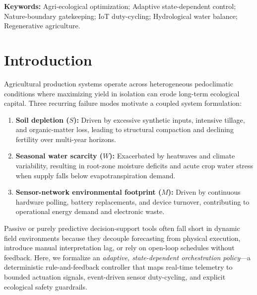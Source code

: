 \documentclass[11pt,a4paper]{article}
\begin{document}
\noindent\textbf{Keywords:} Agri-ecological optimization; Adaptive state-dependent control; Nature-boundary gatekeeping; IoT duty-cycling; Hydrological water balance; Regenerative agriculture.

\section{Introduction}
Agricultural production systems operate across heterogeneous pedoclimatic conditions where maximizing yield in isolation can erode long-term ecological capital. Three recurring failure modes motivate a coupled system formulation:
\begin{enumerate}
  \item \textbf{Soil depletion ($S$):} Driven by excessive synthetic inputs, intensive tillage, and organic-matter loss, leading to structural compaction and declining fertility over multi-year horizons.
  \item \textbf{Seasonal water scarcity ($W$):} Exacerbated by heatwaves and climate variability, resulting in root-zone moisture deficits and acute crop water stress when supply falls below evapotranspiration demand.
  \item \textbf{Sensor-network environmental footprint ($M$):} Driven by continuous hardware polling, battery replacements, and device turnover, contributing to operational energy demand and electronic waste.
\end{enumerate}

Passive or purely predictive decision-support tools often fall short in dynamic field environments because they decouple forecasting from physical execution, introduce manual interpretation lag, or rely on open-loop schedules without feedback. Here, we formalize an \emph{adaptive, state-dependent orchestration policy}---a deterministic rule-and-feedback controller that maps real-time telemetry to bounded actuation signals, event-driven sensor duty-cycling, and explicit ecological safety guardrails.
\end{document}
